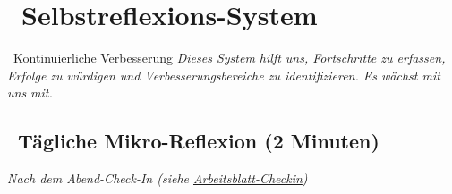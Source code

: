 \newpage
\section*{\textcolor{ctmmPurple}{\faChartLine~Selbstreflexions-System}}
\label{sec:feedback}
\label{sec:selbstreflexion}

\begin{ctmmPurpleBox}{\faSync~Kontinuierliche Verbesserung}
\textit{Dieses System hilft uns, Fortschritte zu erfassen, Erfolge zu würdigen und Verbesserungsbereiche zu identifizieren. Es wächst mit uns mit.}
\end{ctmmPurpleBox}

\subsection*{\faCalendar~Tägliche Mikro-Reflexion (2 Minuten)}
\textit{Nach dem Abend-Check-In (siehe \hyperref[sec:checkin]{Arbeitsblatt-Checkin})}

